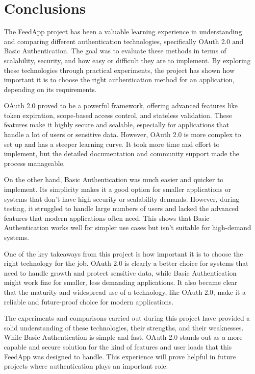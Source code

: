 \section{Conclusions}

The FeedApp project has been a valuable learning experience in understanding and comparing different authentication technologies, specifically OAuth 2.0 and Basic Authentication. The goal was to evaluate these methods in terms of scalability, security, and how easy or difficult they are to implement. By exploring these technologies through practical experiments, the project has shown how important it is to choose the right authentication method for an application, depending on its requirements.

OAuth 2.0 proved to be a powerful framework, offering advanced features like token expiration, scope-based access control, and stateless validation. These features make it highly secure and scalable, especially for applications that handle a lot of users or sensitive data. However, OAuth 2.0 is more complex to set up and has a steeper learning curve. It took more time and effort to implement, but the detailed documentation and community support made the process manageable.

On the other hand, Basic Authentication was much easier and quicker to implement. Its simplicity makes it a good option for smaller applications or systems that don’t have high security or scalability demands. However, during testing, it struggled to handle large numbers of users and lacked the advanced features that modern applications often need. This shows that Basic Authentication works well for simpler use cases but isn’t suitable for high-demand systems.

One of the key takeaways from this project is how important it is to choose the right technology for the job. OAuth 2.0 is clearly a better choice for systems that need to handle growth and protect sensitive data, while Basic Authentication might work fine for smaller, less demanding applications. It also became clear that the maturity and widespread use of a technology, like OAuth 2.0, make it a reliable and future-proof choice for modern applications.

The experiments and comparisons carried out during this project have provided a solid understanding of these technologies, their strengths, and their weaknesses. While Basic Authentication is simple and fast, OAuth 2.0 stands out as a more capable and secure solution for the kind of features and user loads that this FeedApp was designed to handle. This experience will prove helpful in future projects where authentication plays an important role.